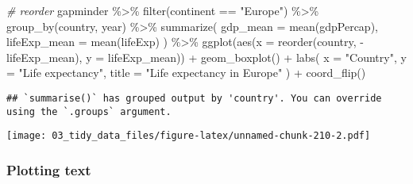 \documentclass[
]{book}
\newenvironment{Shaded}{\begin{snugshade}}{\end{snugshade}}
\newcommand{\AttributeTok}[1]{\textcolor[rgb]{0.77,0.63,0.00}{#1}}
\newcommand{\CommentTok}[1]{\textcolor[rgb]{0.56,0.35,0.01}{\textit{#1}}}
\newcommand{\FunctionTok}[1]{\textcolor[rgb]{0.00,0.00,0.00}{#1}}
\newcommand{\NormalTok}[1]{#1}
\newcommand{\SpecialCharTok}[1]{\textcolor[rgb]{0.00,0.00,0.00}{#1}}
\newcommand{\StringTok}[1]{\textcolor[rgb]{0.31,0.60,0.02}{#1}}
\begin{document}
\begin{Shaded}
\begin{Highlighting}[]
\CommentTok{\# reorder}
\NormalTok{gapminder }\SpecialCharTok{\%\textgreater{}\%}
  \FunctionTok{filter}\NormalTok{(continent }\SpecialCharTok{==} \StringTok{"Europe"}\NormalTok{) }\SpecialCharTok{\%\textgreater{}\%}
  \FunctionTok{group\_by}\NormalTok{(country, year) }\SpecialCharTok{\%\textgreater{}\%}
  \FunctionTok{summarize}\NormalTok{(}
    \AttributeTok{gdp\_mean =} \FunctionTok{mean}\NormalTok{(gdpPercap),}
    \AttributeTok{lifeExp\_mean =} \FunctionTok{mean}\NormalTok{(lifeExp)}
\NormalTok{  ) }\SpecialCharTok{\%\textgreater{}\%}
  \FunctionTok{ggplot}\NormalTok{(}\FunctionTok{aes}\NormalTok{(}\AttributeTok{x =} \FunctionTok{reorder}\NormalTok{(country, }\SpecialCharTok{{-}}\NormalTok{lifeExp\_mean), }\AttributeTok{y =}\NormalTok{ lifeExp\_mean)) }\SpecialCharTok{+}
  \FunctionTok{geom\_boxplot}\NormalTok{() }\SpecialCharTok{+}
  \FunctionTok{labs}\NormalTok{(}
    \AttributeTok{x =} \StringTok{"Country"}\NormalTok{,}
    \AttributeTok{y =} \StringTok{"Life expectancy"}\NormalTok{,}
    \AttributeTok{title =} \StringTok{"Life expectancy in Europe"}
\NormalTok{  ) }\SpecialCharTok{+}
  \FunctionTok{coord\_flip}\NormalTok{()}
\end{Highlighting}
\end{Shaded}

\begin{verbatim}
## `summarise()` has grouped output by 'country'. You can override using the `.groups` argument.
\end{verbatim}

\texttt{[image: 03\_tidy\_data\_files/figure-latex/unnamed-chunk-210-2.pdf]}

\hypertarget{plotting-text}{%
\subsubsection{Plotting text}\label{plotting-text}}
\end{document}
